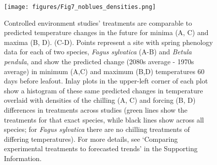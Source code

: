 \documentclass[11pt,letter]{article}
\begin{document}
\begin{figure}[t!]
\centering
\texttt{[image: figures/Fig7\_noblues\_densities.png]}
\caption{Controlled environment studies' treatments are comparable to predicted temperature changes in the future for minima (A, C) and maxima (B, D). (C-D). Points represent a site with spring phenology data for each of two species, \emph{Fagus sylvatica} (A-B) and \emph{Betula pendula}, \citep[from the PEP725 database,][]{Templ2018} and show the predicted change (2080s average - 1970s average) in minimum (A,C) and maximum (B,D) temperatures 60 days before leafout. Inlay plots in the upper-left  corner of each plot show a histogram of these same predicted changes in temperature overlaid with densities of the chilling (A, C) and forcing (B, D) differences in treatments across studies (green lines show the treatments for that exact species, while black lines show across all species; for \emph{Fagus sylvatica} there are no chilling treatments of differing temperatures). For more details, see `Comparing experimental treatments to forecasted trends' in the Supporting Information.}
  \label{fig:pep} %
\end{figure}
\end{document}
